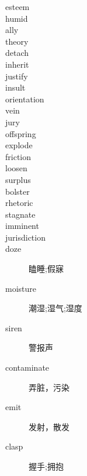 \documentclass[a4paper, 10pt]{ctexart}
\begin{document}
\begin{multicols*}{2}
\begin{description}
\item[esteem] 

\item[humid] 

\item[ally] 

\item[theory] 

\item[detach] 

\item[inherit] 

\item[justify] 

\item[insult] 

\item[orientation] 

\item[vein] 

\item[jury] 

\item[offspring] 

\item[explode] 

\item[friction] 

\item[loosen] 

\item[surplus] 

\item[bolster] 

\item[rhetoric] 

\item[stagnate] 

\item[imminent] 

\item[jurisdiction] 

\item[doze] 瞌睡;假寐

\item[moisture] 潮湿;湿气;湿度

\item[siren] 警报声

\item[contaminate] 弄脏，污染

\item[emit] 发射，散发

\item[clasp] 握手;拥抱


\end{description}
\end{multicols*}
\end{document}
